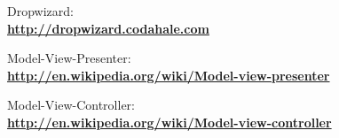 \begin{thebibliography}{1}
 Dropwizard:\\
\textbf{ \url{http://dropwizard.codahale.com}}

 Model-View-Presenter:\\
\textbf{ \url{http://en.wikipedia.org/wiki/Model-view-presenter}}

 Model-View-Controller:\\
\textbf{ \url{http://en.wikipedia.org/wiki/Model-view-controller}}

\end{thebibliography}
